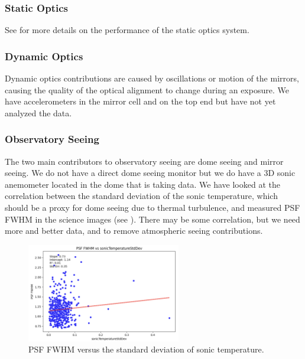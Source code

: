 \subsubsection{Static Optics}

See  for more details on the performance of the static optics system.

\subsubsection{Dynamic Optics}

Dynamic optics contributions are caused by oscillations or motion of the mirrors, causing the quality of the
optical alignment to change during an exposure. We have accelerometers in the mirror cell and on the top end
but have not yet analyzed the data.

\subsubsection{Observatory Seeing}

The two main contributors to observatory seeing are dome seeing and mirror seeing. We do not have a direct dome seeing monitor but we do have a 3D sonic anemometer located in the dome that is taking data. We have looked at the correlation between the standard deviation of the sonic temperature, which should be a proxy for dome seeing due to thermal turbulence, and measured PSF FWHM in the science images (see ). There may be some correlation, but we need more and better data, and to remove atmospheric seeing contributions.

\begin{figure}
  \begin{center}
    \includegraphics[width=0.6\textwidth]{image_quality_figures/anemometer_PSF.png}
  \end{center}
  \caption{PSF FWHM versus the standard deviation of sonic temperature.}
  \label{fig:anemometer}
\end{figure}

